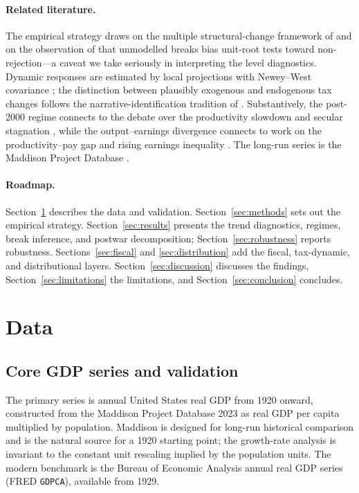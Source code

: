 \documentclass[11pt]{article}
\begin{document}
\paragraph{Related literature.} The empirical strategy draws on the multiple
structural-change framework of \citet{baiperron1998,baiperron2003} and on the
observation of \citet{perron1989} that unmodelled breaks bias unit-root tests
toward non-rejection---a caveat we take seriously in interpreting the level
diagnostics. Dynamic responses are estimated by local projections
\citep{jorda2005} with Newey--West covariance \citep{neweywest1987}; the
distinction between plausibly exogenous and endogenous tax changes follows the
narrative-identification tradition of \citet{romerromer2010}. Substantively, the
post-2000 regime connects to the debate over the productivity slowdown
\citep{gordon2016,fernald2015} and secular stagnation \citep{summers2015}, while
the output--earnings divergence connects to work on the productivity--pay gap
\citep{stansburysummers2018} and rising earnings inequality \citep{autor2014}.
The long-run series is the Maddison Project Database \citep{boltvanzanden2020}.

\paragraph{Roadmap.} Section~\ref{sec:data} describes the data and validation.
Section~\ref{sec:methods} sets out the empirical strategy. Section~\ref{sec:results}
presents the trend diagnostics, regimes, break inference, and postwar
decomposition; Section~\ref{sec:robustness} reports robustness. Sections~\ref{sec:fiscal}
and \ref{sec:distribution} add the fiscal, tax-dynamic, and distributional layers.
Section~\ref{sec:discussion} discusses the findings, Section~\ref{sec:limitations}
the limitations, and Section~\ref{sec:conclusion} concludes.

\section{Data}
\label{sec:data}

\subsection{Core GDP series and validation}

The primary series is annual United States real GDP from 1920 onward, constructed
from the Maddison Project Database 2023 \citep{boltvanzanden2020} as real GDP per
capita multiplied by population. Maddison is designed for long-run historical
comparison and is the natural source for a 1920 starting point; the growth-rate
analysis is invariant to the constant unit rescaling implied by the population
units. The modern benchmark is the Bureau of Economic Analysis annual real GDP
series (FRED \texttt{GDPCA}), available from 1929.
\end{document}

